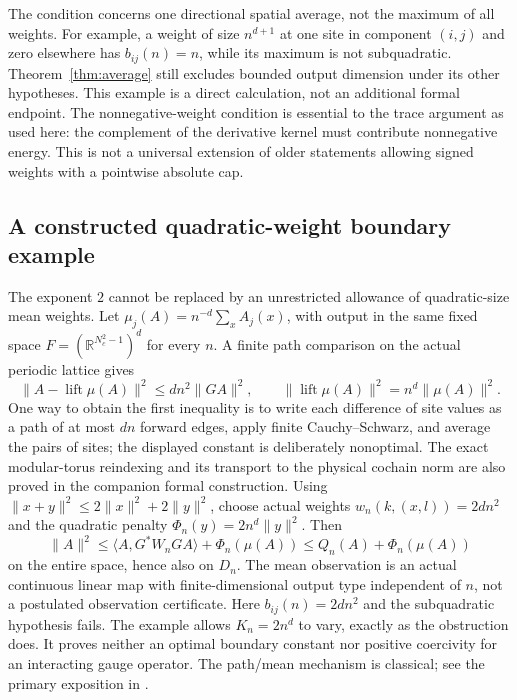 \documentclass[11pt]{article}
\newcommand{\R}{\mathbb R}
\newcommand{\ip}[2]{\langle #1,#2\rangle}
\begin{document}
The condition concerns one directional spatial average, not the maximum
of all weights. For example, a weight of size $n^{d+1}$ at one site in
component $(i,j)$ and zero elsewhere has $b_{ij}(n)=n$, while its maximum
is not subquadratic. Theorem~\ref{thm:average} still excludes bounded
output dimension under its other hypotheses. This example is a direct
calculation, not an additional formal endpoint. The nonnegative-weight
condition is essential to the trace argument as used here: the complement
of the derivative kernel must contribute nonnegative energy. This is not
a universal extension of older statements allowing signed weights with a
pointwise absolute cap.

\subsection{A constructed quadratic-weight boundary example}
The exponent $2$ cannot be replaced by an unrestricted allowance of
quadratic-size mean weights. Let
$\mu_j(A)=n^{-d}\sum_x A_j(x)$, with output in the same fixed space
$F=(\R^{N_c^2-1})^d$ for every $n$. A finite path comparison on the actual
periodic lattice gives
\[
 \|A-\operatorname{lift}\mu(A)\|^2\leq d n^2\|GA\|^2,
 \qquad \|\operatorname{lift}\mu(A)\|^2=n^d\|\mu(A)\|^2.
\]
One way to obtain the first inequality is to write each difference of
site values as a path of at most $dn$ forward edges, apply finite
Cauchy--Schwarz, and average the pairs of sites; the displayed constant
is deliberately nonoptimal. The exact modular-torus reindexing and its
transport to the physical cochain norm are also proved in the companion
formal construction.
Using $\|x+y\|^2\leq2\|x\|^2+2\|y\|^2$, choose actual weights
$w_n(k,(x,l))=2dn^2$ and the quadratic penalty
$\Phi_n(y)=2n^d\|y\|^2$. Then
\[
 \|A\|^2\leq\ip{A}{G^*W_nGA}+\Phi_n(\mu(A))
                  \leq Q_n(A)+\Phi_n(\mu(A))
\]
on the entire space, hence also on $D_n$. The mean observation is an
actual continuous linear map with finite-dimensional output type
independent of $n$, not a postulated observation certificate. Here
$b_{ij}(n)=2dn^2$ and the subquadratic hypothesis fails. The example
allows $K_n=2n^d$ to vary, exactly as the obstruction does. It proves
neither an optimal boundary constant nor positive coercivity for an
interacting gauge operator. The path/mean mechanism is classical;
see the primary exposition in \cite{levin-peres}.
\end{document}

